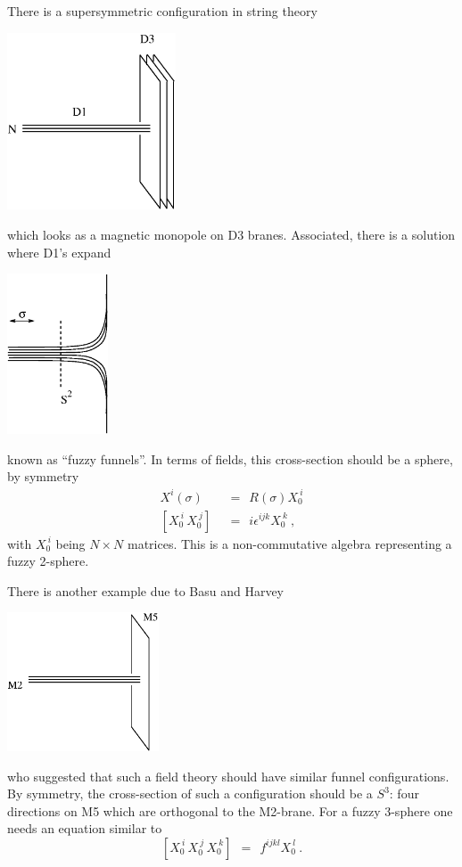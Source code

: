 \documentclass[12pt]{article}
\begin{document}
There is a supersymmetric configuration in string theory
\begin{center}
\includegraphics[width=5.0cm]{D1D3.eps}
\end{center}
which looks as a magnetic monopole on D3 branes.
Associated, there is a solution where D1's expand
\begin{center}
\includegraphics[width=3.0cm]{fuzzy.eps}
\end{center}
known as ``fuzzy funnels''.
In terms of fields, this cross-section should be a sphere, by symmetry
\begin{align*}
	X^i(\sigma) & ~~=~~ R(\sigma) X_0^{\ i}  \\
	[ X_0^{\ i} \, X_0^{\ j} ] & ~~=~~ i \epsilon^{ijk} X_0^{\ k}~,
\end{align*}
with $ X_0^{\ i} $ being $ N\times N $ matrices.
This is a non-commutative algebra representing a fuzzy 2-sphere.

There is another example due to Basu and Harvey \cite{Basu:2004ed} 
\begin{center}
\includegraphics[width=4.5cm]{M2M5.eps}
\end{center}
who suggested that such a field theory should have similar funnel configurations.
By symmetry, the cross-section of such a configuration should be a $ S^3 $: four directions
on M5 which are orthogonal to the M2-brane.
For a fuzzy 3-sphere one needs an equation similar to
\[
	\left[ X_0^{\ i} \, X_0^{\ j} \, X_0^{\ k} \right] ~~=~~ f^{ijkl} X_0^{\ l}~.
\]
\end{document}
